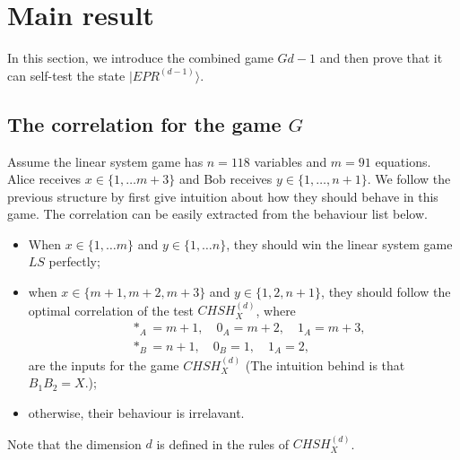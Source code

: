 \documentclass[11pt,letterpaper]{article}
\newcommand{\ket}[1]{|#1\rangle}
\newcommand{\1}{\mathbb{1}}
\newcommand{\CHSH}{CHSH^{(d)}}
\newcommand{\EPR}[1]{EPR^{(#1)}}
\newcommand{\G}{G}
\newcommand{\LS}{LS}
\theoremstyle{definition}
\begin{document}
\section{Main result}
\label{sec:main}
In this section, we introduce the combined game $\G{d-1}$ and then
prove that it can self-test the state $\ket{\EPR{d-1}}$.

\subsection{The correlation for the game $\G$}
Assume the linear system game has $n=118$ variables and $m=91$ equations.
Alice receives $x \in \{1,\dots m+3 \}$ and Bob receives
$y \in \{1,\dots,n+1\}$. We follow the previous structure by first give intuition about how they should
behave in this game. The correlation can be easily extracted from the behaviour list below.
\begin{itemize}
	\item When $x \in \{1,\dots m\}$ and $y \in \{1, \dots n\}$, they should win the 
	linear system game $\LS$ perfectly;
	\item when $x \in \{m+1, m+2, m+3\}$ and $y \in \{1, 2, n+1\}$, they should follow the
	optimal correlation of the test $\CHSH_X$, where 
	\begin{align}
		&\ast_A = m+1, \quad 0_A = m+2,\quad 1_A = m+3,\\
		&\ast_B = n+1,\quad 0_B = 1, \quad 1_A = 2,
	\end{align}
	are the inputs for the game $\CHSH_X$
	(The intuition behind is that $B_1B_2 = X$.);
	\item otherwise, their behaviour is irrelavant.
\end{itemize}
Note that the dimension $d$ is defined in the rules of $\CHSH_X$.
\end{document}
